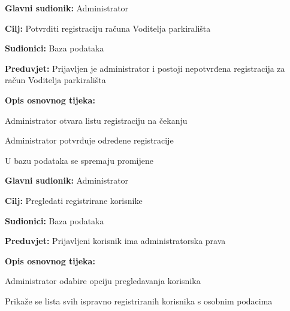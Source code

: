                         \noindent {}
					\begin{packed_item}
	
						\item \textbf{Glavni sudionik: }Administrator
						\item  \textbf{Cilj:} Potvrditi registraciju računa Voditelja parkirališta
						\item  \textbf{Sudionici:} Baza podataka
						\item  \textbf{Preduvjet:} Prijavljen je administrator i postoji nepotvrđena registracija za račun Voditelja parkirališta
						\item  \textbf{Opis osnovnog tijeka:}
						
						\item[] \begin{packed_enum}
	
							\item Administrator otvara listu registraciju na čekanju
							\item Administrator potvrđuje određene registracije
							\item U bazu podataka se spremaju promijene
							
						\end{packed_enum}

        	
					\end{packed_item}

                        \noindent {}
					\begin{packed_item}
	
						\item \textbf{Glavni sudionik: }Administrator
						\item  \textbf{Cilj:} Pregledati registrirane korisnike
						\item  \textbf{Sudionici:} Baza podataka
						\item  \textbf{Preduvjet:} Prijavljeni korisnik ima administratorska prava
						\item  \textbf{Opis osnovnog tijeka:}
						
						\item[] \begin{packed_enum}
	
							\item Administrator odabire opciju pregledavanja korisnika
							\item Prikaže se lista svih ispravno registriranih korisnika s osobnim podacima
			
						\end{packed_enum}

                    
					\end{packed_item}


